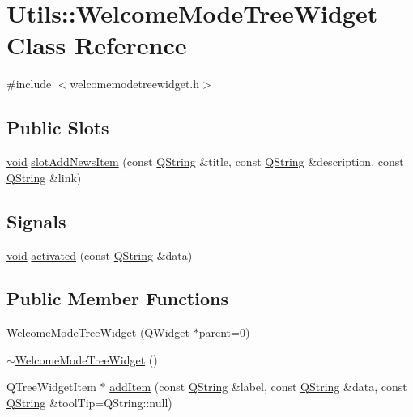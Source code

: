 \hypertarget{class_utils_1_1_welcome_mode_tree_widget}{\section{\-Utils\-:\-:\-Welcome\-Mode\-Tree\-Widget \-Class \-Reference}
\label{class_utils_1_1_welcome_mode_tree_widget}
}


{\ttfamily \#include $<$welcomemodetreewidget.\-h$>$}

\subsection*{\-Public \-Slots}
\begin{DoxyCompactItemize}
\item 
\hyperlink{group___u_a_v_objects_plugin_ga444cf2ff3f0ecbe028adce838d373f5c}{void} \hyperlink{class_utils_1_1_welcome_mode_tree_widget_ad3bfb5c7084907a7f3bcca9ba2569033}{slot\-Add\-News\-Item} (const \hyperlink{group___u_a_v_objects_plugin_gab9d252f49c333c94a72f97ce3105a32d}{\-Q\-String} \&title, const \hyperlink{group___u_a_v_objects_plugin_gab9d252f49c333c94a72f97ce3105a32d}{\-Q\-String} \&description, const \hyperlink{group___u_a_v_objects_plugin_gab9d252f49c333c94a72f97ce3105a32d}{\-Q\-String} \&link)
\end{DoxyCompactItemize}
\subsection*{\-Signals}
\begin{DoxyCompactItemize}
\item 
\hyperlink{group___u_a_v_objects_plugin_ga444cf2ff3f0ecbe028adce838d373f5c}{void} \hyperlink{class_utils_1_1_welcome_mode_tree_widget_a6364bd06f202e06b8d1b023bd9df2526}{activated} (const \hyperlink{group___u_a_v_objects_plugin_gab9d252f49c333c94a72f97ce3105a32d}{\-Q\-String} \&data)
\end{DoxyCompactItemize}
\subsection*{\-Public \-Member \-Functions}
\begin{DoxyCompactItemize}
\item 
\hyperlink{class_utils_1_1_welcome_mode_tree_widget_aa3be7e2a277edb1a7016cdf847d04dc8}{\-Welcome\-Mode\-Tree\-Widget} (\-Q\-Widget $\ast$parent=0)
\item 
\hyperlink{class_utils_1_1_welcome_mode_tree_widget_add305bb794493c55381197534fe2b5dc}{$\sim$\-Welcome\-Mode\-Tree\-Widget} ()
\item 
\-Q\-Tree\-Widget\-Item $\ast$ \hyperlink{class_utils_1_1_welcome_mode_tree_widget_a00975ed0f3a6b41f6b976da61820f240}{add\-Item} (const \hyperlink{group___u_a_v_objects_plugin_gab9d252f49c333c94a72f97ce3105a32d}{\-Q\-String} \&label, const \hyperlink{group___u_a_v_objects_plugin_gab9d252f49c333c94a72f97ce3105a32d}{\-Q\-String} \&data, const \hyperlink{group___u_a_v_objects_plugin_gab9d252f49c333c94a72f97ce3105a32d}{\-Q\-String} \&tool\-Tip=\-Q\-String\-::null)
\end{DoxyCompactItemize}
